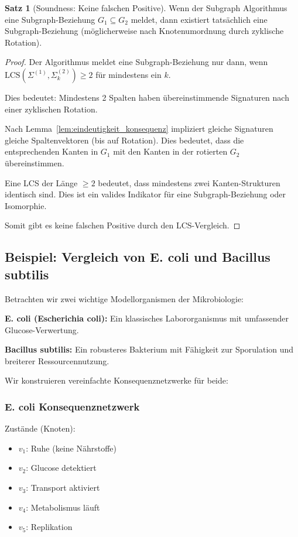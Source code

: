 \documentclass[a4paper,12pt]{article}
\theoremstyle{definition}
\newtheorem{satz}{Satz}
\begin{document}
\begin{satz}[Soundness: Keine falschen Positive]
\label{satz:soundness}
Wenn der Subgraph Algorithmus eine Subgraph-Beziehung $G_1 \subseteq G_2$ meldet, dann existiert tatsächlich eine Subgraph-Beziehung (möglicherweise nach Knotenumordnung durch zyklische Rotation).
\end{satz}

\begin{proof}
Der Algorithmus meldet eine Subgraph-Beziehung nur dann, wenn $\text{LCS}(\Sigma^{(1)}, \Sigma^{(2)}_k) \geq 2$ für mindestens ein $k$.

Dies bedeutet: Mindestens 2 Spalten haben übereinstimmende Signaturen nach einer zyklischen Rotation.

Nach Lemma~\ref{lem:eindeutigkeit_konsequenz} impliziert gleiche Signaturen gleiche Spaltenvektoren (bis auf Rotation). Dies bedeutet, dass die entsprechenden Kanten in $G_1$ mit den Kanten in der rotierten $G_2$ übereinstimmen.

Eine LCS der Länge $\geq 2$ bedeutet, dass mindestens zwei Kanten-Strukturen identisch sind. Dies ist ein valides Indikator für eine Subgraph-Beziehung oder Isomorphie.

Somit gibt es keine falschen Positive durch den LCS-Vergleich.
\end{proof}

\subsection{Beispiel: Vergleich von E. coli und Bacillus subtilis}

Betrachten wir zwei wichtige Modellorganismen der Mikrobiologie:

\textbf{E. coli (Escherichia coli):} Ein klassisches Labororganismus mit umfassender Glucose-Verwertung.

\textbf{Bacillus subtilis:} Ein robusteres Bakterium mit Fähigkeit zur Sporulation und breiterer Ressourcennutzung.

Wir konstruieren vereinfachte Konsequenznetzwerke für beide:

\subsubsection{E. coli Konsequenznetzwerk}

Zustände (Knoten):
\begin{itemize}
    \item $v_1$: Ruhe (keine Nährstoffe)
    \item $v_2$: Glucose detektiert
    \item $v_3$: Transport aktiviert
    \item $v_4$: Metabolismus läuft
    \item $v_5$: Replikation
\end{itemize}
\end{document}
